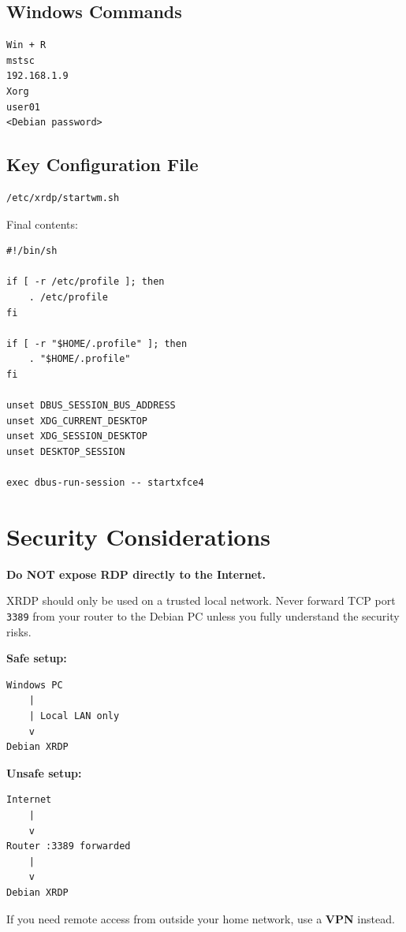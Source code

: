 \documentclass[a4paper,12pt]{article}
\newcommand{\code}[1]{\texttt{\small #1}}
\begin{document}
\subsection{Windows Commands}

\begin{lstlisting}[style=textstyle]
Win + R
mstsc
192.168.1.9
Xorg
user01
<Debian password>
\end{lstlisting}

\subsection{Key Configuration File}

\begin{lstlisting}[style=textstyle]
/etc/xrdp/startwm.sh
\end{lstlisting}

Final contents:

\begin{lstlisting}[style=shstyle]
#!/bin/sh

if [ -r /etc/profile ]; then
    . /etc/profile
fi

if [ -r "$HOME/.profile" ]; then
    . "$HOME/.profile"
fi

unset DBUS_SESSION_BUS_ADDRESS
unset XDG_CURRENT_DESKTOP
unset XDG_SESSION_DESKTOP
unset DESKTOP_SESSION

exec dbus-run-session -- startxfce4
\end{lstlisting}

\section{Security Considerations}

\begin{warnbox}
\textbf{Do NOT expose RDP directly to the Internet.}

XRDP should only be used on a trusted local network. Never forward TCP port \code{3389} from your router to the Debian PC unless you fully understand the security risks.

\textbf{Safe setup:}

\begin{lstlisting}[style=textstyle]
Windows PC
    |
    | Local LAN only
    v
Debian XRDP
\end{lstlisting}

\textbf{Unsafe setup:}

\begin{lstlisting}[style=textstyle]
Internet
    |
    v
Router :3389 forwarded
    |
    v
Debian XRDP
\end{lstlisting}

If you need remote access from outside your home network, use a \textbf{VPN} instead.
\end{warnbox}
\end{document}
